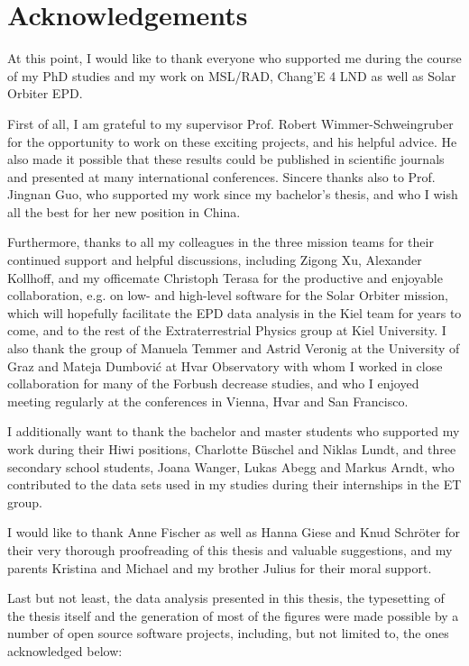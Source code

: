 \chapter*{Acknowledgements}

At this point, I would like to thank everyone who supported me during the course of my PhD studies and my work on MSL/RAD, Chang'E 4 LND as well as Solar Orbiter EPD.

First of all, I am grateful to my supervisor Prof. Robert Wimmer-Schweingruber for the opportunity to work on these exciting projects, and his helpful advice. He also made it possible that these results could be published in scientific journals and presented at many international conferences. Sincere thanks also to Prof. Jingnan Guo, who supported my work since my bachelor's thesis, and who I wish all the best for her new position in China.

Furthermore, thanks to all my colleagues in the three mission teams for their continued support and helpful discussions, including Zigong Xu, Alexander Kollhoff, and my officemate Christoph Terasa for the productive and enjoyable collaboration, e.g. on low- and high-level software for the Solar Orbiter mission, which will hopefully facilitate the EPD data analysis in the Kiel team for years to come, and to the rest of the Extraterrestrial Physics group at Kiel University. I also thank the group of Manuela Temmer and Astrid Veronig at the University of Graz and Mateja Dumbović at Hvar Observatory with whom I worked in close collaboration for many of the Forbush decrease studies, and who I enjoyed meeting regularly at the conferences in Vienna, Hvar and San Francisco.

I additionally want to thank the bachelor and master students who supported my work during their Hiwi positions, Charlotte Büschel and Niklas Lundt, and three secondary school students, Joana Wanger, Lukas Abegg and Markus Arndt, who contributed to the data sets used in my studies during their internships in the ET group.

I would like to thank Anne Fischer as well as Hanna Giese and Knud Schröter for their very thorough proofreading of this thesis and valuable suggestions, and my parents Kristina and Michael and my brother Julius for their moral support. 

Last but not least, the data analysis presented in this thesis, the typesetting of the thesis itself and the generation of most of the figures were made possible by a number of open source software projects, including, but not limited to, the ones acknowledged below:

\begin{refsection}
	\nocite{*}
	\newrefcontext[sorting=none]
	\printbibliography[heading=none]
\end{refsection}
